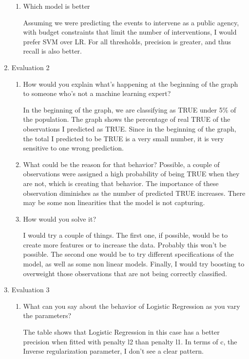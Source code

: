 \documentclass[a4paper, 11pt]{article}
\begin{document}
\begin{enumerate}
\begin{enumerate}
	\item Which model is better
	
	Assuming we were predicting the events to intervene as a public agency, with budget constraints that limit the number of interventions, I would prefer SVM over LR. For all thresholds, precision is greater, and thus recall is also better. 
	\end{enumerate}
	
\item Evaluation 2
\begin{enumerate}
\item How would you explain what’s happening at the beginning of the graph to someone who’s not a machine learning expert?

In the beginning of the graph, we are classifying as TRUE under 5\% of the population. The graph shows the percentage of real TRUE of the observations I predicted as TRUE. Since in the beginning of the graph, the total I predicted to be TRUE is a very small number, it is very sensitive to one wrong prediction. 

\item What could be the reason for that behavior?
Possible, a couple of observations were assigned a high probability of being TRUE when they are not, which is creating that behavior. The importance of these observation diminishes as the number of predicted TRUE increases. There may be some non linearities that the model is not capturing. 

\item How would you solve it?

I would try a couple of things. The first one, if possible, would be to create more features or to increase the data. Probably this won't be possible. The second one would be to try different specifications of the model, as well as some non linear models. Finally, I would try boosting to overweight those observations that are not being correctly classified.

\end{enumerate}

\item Evaluation 3
\begin{enumerate}
\item What can you say about the behavior of Logistic Regression as you vary the parameters?

The table shows that Logistic Regression in this case has a better precision when fitted with penalty l2 than penalty l1. In terms of c, the Inverse regularization parameter, I don't see a clear pattern.


\end{enumerate}
\end{enumerate}
\end{document}
